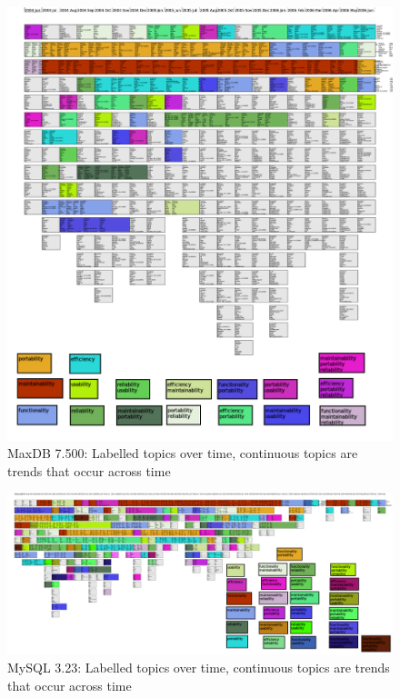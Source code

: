 \documentclass{acm_proc_article-sp}
\begin{document}
\begin{figure}
  \centering
  \includegraphics[height=.9\textheight]{small-maxdb-time-smear-plot-Equal}
  \caption{MaxDB 7.500: Labelled topics over time, continuous topics are trends that occur across time}
  \label{fig:maxdb}
\end{figure}

\begin{figure}
  \centering
  \includegraphics[width=.99\textwidth]{small-mysql-time-smear-plot-Equal}
  \caption{MySQL 3.23: Labelled topics over time, continuous topics are trends that occur across time}
  \label{fig:mysql}
\end{figure}
\end{document}
